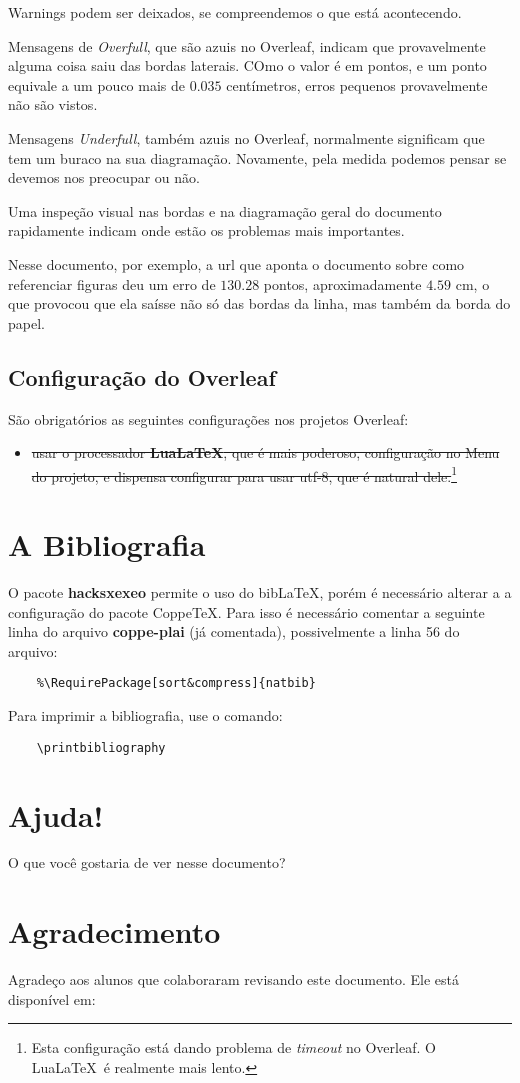 \documentclass{article}
\begin{document}
Warnings podem ser deixados, se compreendemos o que está acontecendo.

Mensagens de \textit{Overfull}, que são azuis no Overleaf, indicam que provavelmente alguma coisa saiu das bordas laterais. COmo o valor é em pontos, e um ponto equivale a um pouco mais de  $0.035$ centímetros, erros pequenos provavelmente não são vistos.

Mensagens \textit{Underfull}, também azuis no Overleaf, normalmente significam que tem um buraco na sua diagramação. Novamente, pela medida podemos pensar se devemos nos preocupar ou não.

Uma inspeção visual nas bordas e na diagramação geral do documento rapidamente indicam onde estão os problemas mais importantes.

Nesse documento, por exemplo, a url que aponta o documento sobre como referenciar figuras deu um erro de $130.28$ pontos, aproximadamente $4.59$ cm, o que provocou que ela saísse não só das bordas da linha, mas também da borda do papel.

\subsection{Configuração do Overleaf}    
    
     São obrigatórios as seguintes configurações nos projetos Overleaf:
    \begin{itemize}
        \item \sout{usar o processador \textbf{Lua\LaTeX}, que é mais poderoso, configuração no Menu do projeto, e dispensa configurar para usar utf-8, que é natural dele.}\footnote{Esta configuração está dando problema de \textit{timeout} no Overleaf. O Lua\LaTeX\ é realmente mais lento.  }
\end{itemize}

\section{A Bibliografia}

O pacote \textbf{hacksxexeo} permite o uso do bib\LaTeX, porém é necessário alterar a a configuração do pacote Coppe\TeX. Para isso é necessário comentar a seguinte linha do arquivo \textbf{coppe-plai} (já comentada), possivelmente a linha 56 do arquivo:

\begin{verbatim}
    %\RequirePackage[sort&compress]{natbib}
\end{verbatim}

Para imprimir a bibliografia, use o comando:
\begin{verbatim}
    \printbibliography
\end{verbatim}


\section{Ajuda!}
O que você gostaria de ver nesse documento? 
\section{Agradecimento}
Agradeço aos alunos que colaboraram revisando este documento. Ele está disponível em: 

\printbibliography
\end{document}
